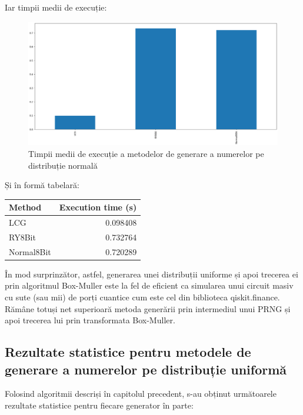 Iar timpii medii de execuție:

\begin{figure}[H]
    \centering
    \includegraphics[width=1.0\textwidth]{continut/capitol4/figuri/NormalMeanTimes.png}
    \caption{Timpii medii de execuție a metodelor de generare a numerelor pe distribuție normală}
    \label{fig:NormalMeanTimes}
\end{figure}

Și în formă tabelară:

\begin{tabular}{|l|r|}
\hline
{Method} & {Execution time (s)} \\
\hline
LCG        &  0.098408 \\
RY8Bit     &  0.732764 \\
Normal8Bit &  0.720289 \\
\hline
\end{tabular}

În mod surprinzător, astfel, generarea unei distribuții uniforme și apoi trecerea ei prin algoritmul Box-Muller este la fel de eficient ca simularea unui circuit masiv cu sute (sau mii) de porți cuantice cum este cel din biblioteca qiskit.finance. Rămâne totuși net superioară metoda generării prin intermediul unui PRNG și apoi trecerea lui prin transformata Box-Muller.

\subsection{Rezultate statistice pentru metodele de generare a numerelor pe distribuție uniformă}

Folosind algoritmii descriși în capitolul precedent, s-au obținut următoarele rezultate statistice pentru fiecare generator în parte:



